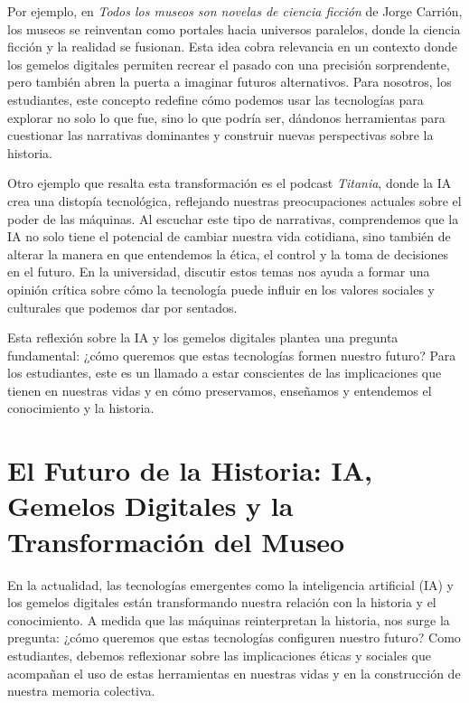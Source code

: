 \documentclass[
  spanish,
  11pt,
  a4paper,
]{scrbook}
\begin{document}
Por ejemplo, en \emph{Todos los museos son novelas de ciencia ficción}
de Jorge Carrión, los museos se reinventan como portales hacia universos
paralelos, donde la ciencia ficción y la realidad se fusionan. Esta idea
cobra relevancia en un contexto donde los gemelos digitales permiten
recrear el pasado con una precisión sorprendente, pero también abren la
puerta a imaginar futuros alternativos. Para nosotros, los estudiantes,
este concepto redefine cómo podemos usar las tecnologías para explorar
no solo lo que fue, sino lo que podría ser, dándonos herramientas para
cuestionar las narrativas dominantes y construir nuevas perspectivas
sobre la historia.

Otro ejemplo que resalta esta transformación es el podcast
\emph{Titania}, donde la IA crea una distopía tecnológica, reflejando
nuestras preocupaciones actuales sobre el poder de las máquinas. Al
escuchar este tipo de narrativas, comprendemos que la IA no solo tiene
el potencial de cambiar nuestra vida cotidiana, sino también de alterar
la manera en que entendemos la ética, el control y la toma de decisiones
en el futuro. En la universidad, discutir estos temas nos ayuda a formar
una opinión crítica sobre cómo la tecnología puede influir en los
valores sociales y culturales que podemos dar por sentados.

Esta reflexión sobre la IA y los gemelos digitales plantea una pregunta
fundamental: ¿cómo queremos que estas tecnologías formen nuestro futuro?
Para los estudiantes, este es un llamado a estar conscientes de las
implicaciones que tienen en nuestras vidas y en cómo preservamos,
enseñamos y entendemos el conocimiento y la historia.

\section*{El Futuro de la Historia: IA, Gemelos Digitales y la
Transformación del
Museo}\label{el-futuro-de-la-historia-ia-gemelos-digitales-y-la-transformaciuxf3n-del-museo}


En la actualidad, las tecnologías emergentes como la inteligencia
artificial (IA) y los gemelos digitales están transformando nuestra
relación con la historia y el conocimiento. A medida que las máquinas
reinterpretan la historia, nos surge la pregunta: ¿cómo queremos que
estas tecnologías configuren nuestro futuro? Como estudiantes, debemos
reflexionar sobre las implicaciones éticas y sociales que acompañan el
uso de estas herramientas en nuestras vidas y en la construcción de
nuestra memoria colectiva.
\end{document}
